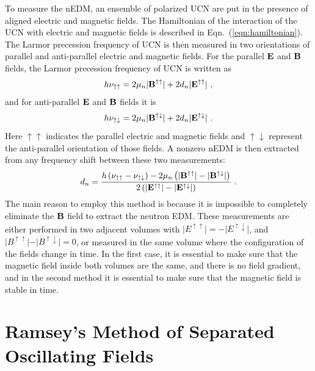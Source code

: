 To measure the nEDM, an ensemble of polarized UCN are put in the
presence of aligned electric and magnetic fields. The Hamiltonian of
the interaction of the UCN with electric and magnetic fields is
described in Eqn.~(\ref{eqn:hamiltonian}). The Larmor precession
frequency of UCN is then measured in two orientations of parallel and
anti-parallel electric and magnetic fields. For the parallel $\bf{E}$
and $\bf{B}$ fields, the Larmor precession frequency of UCN is written
as
\begin{equation}
\label{eqn:parallelEandB}
  h \nu_{\uparrow \uparrow} = 2 \mu_n \vert {\bf{B^{\uparrow \uparrow}}} \vert+ 2 d_n\vert \bf{ E^{\uparrow \uparrow}} \vert~,
\end{equation}
and for anti-parallel  $\bf{E}$ and $\bf{B}$ fields it is
\begin{equation}
\label{eqn:antiparallelEandB}
  h \nu_{\uparrow \downarrow} = 2 \mu_n \vert {\bf{B^{\uparrow \downarrow}}} \vert+ 2 d_n\vert \bf{ E^{\uparrow \downarrow}} \vert~.
\end{equation}
Here $\uparrow \uparrow$ indicates the parallel electric and magnetic
fields and $\uparrow \downarrow$ represent the anti-parallel
orientation of those fields.  A nonzero nEDM is then extracted from
any frequency shift between these two measurements:
\begin{equation}
  \label{eqn:dn}
  d_n = \frac{h \left( \nu_{\uparrow \uparrow} - \nu_{\uparrow \downarrow} \right) - 2 \mu_n \left( \vert {\bf{B^{\uparrow \uparrow}}} \vert -\vert {\bf{B^{\uparrow \downarrow}}} \vert \right)}{2 \left(\vert \bf{ E^{\uparrow \uparrow}} \vert - \vert \bf{ E^{\uparrow \downarrow}} \vert \right)}~.
\end{equation}
The main reason to employ this method is because it is impossible to
completely eliminate the $\bf{B}$ field to extract the neutron
EDM. These measurements are either performed in two adjacent volumes
with
$\vert E^{\uparrow \uparrow} \vert = - \vert E^{\uparrow \downarrow}
\vert$, and
$\vert B^{\uparrow \uparrow}\vert - \vert B^{\uparrow \downarrow} \vert= 0
$, or measured in the same volume where the configuration of the fields
change in time. In the first case, it is essential to make sure that
the magnetic field inside both volumes are the same, and there is no
field gradient, and in the second method it is essential to make sure
that the magnetic field is stable in time.

\section{Ramsey's Method of Separated Oscillating
  Fields\label{sec:Ramsey}}

